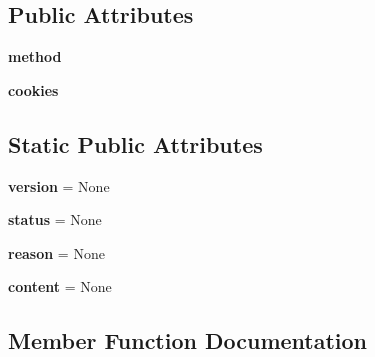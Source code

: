 \subsection*{Public Attributes}
\begin{DoxyCompactItemize}
\item 
\mbox{\label{classaiohttp_1_1client__reqrep_1_1_client_response_a35b35579b42e3385c96b75b0b453473e}} 
{\bfseries method}
\item 
\mbox{\label{classaiohttp_1_1client__reqrep_1_1_client_response_aced500b66bb97ee0ffc5cab079102c78}} 
{\bfseries cookies}
\end{DoxyCompactItemize}
\subsection*{Static Public Attributes}
\begin{DoxyCompactItemize}
\item 
\mbox{\label{classaiohttp_1_1client__reqrep_1_1_client_response_a3c86a0c845389753959e4750145f0169}} 
{\bfseries version} = None
\item 
\mbox{\label{classaiohttp_1_1client__reqrep_1_1_client_response_a50e42dd2469db396059789844daf9f5a}} 
{\bfseries status} = None
\item 
\mbox{\label{classaiohttp_1_1client__reqrep_1_1_client_response_ab56fdd2f1c1b0f070e6c182b67540071}} 
{\bfseries reason} = None
\item 
\mbox{\label{classaiohttp_1_1client__reqrep_1_1_client_response_af040d921a4389f4c190dccd805e1430a}} 
{\bfseries content} = None
\end{DoxyCompactItemize}


\subsection{Member Function Documentation}
\mbox{\label{classaiohttp_1_1client__reqrep_1_1_client_response_ad0b2aa94127bccbc8450d0d1de85e8e8}} 
